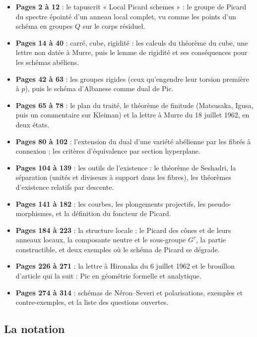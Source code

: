 \documentclass[11pt,a4paper]{article}
\begin{document}
\begin{itemize}
  \item \textbf{Pages 2 à 12} : le tapuscrit « Local Picard schemes » : le
    groupe de Picard du spectre épointé d'un anneau local complet, vu comme les
    points d'un schéma en groupes $Q$ sur le corps résiduel.
  \item \textbf{Pages 14 à 40} : carré, cube, rigidité : les calculs du
    théorème du cube, une lettre non datée à Murre, puis le lemme de rigidité et
    ses conséquences pour les schémas abéliens.
  \item \textbf{Pages 42 à 63} : les groupes rigides (ceux qu'engendre leur
    torsion première à $p$), puis le schéma d'Albanese comme dual de $\mathrm{Pic}$.
  \item \textbf{Pages 65 à 78} : le plan du traité, le théorème de finitude
    (Matsusaka, Igusa, puis un commentaire sur Kleiman) et la lettre à Murre du
    18 juillet 1962, en deux états.
  \item \textbf{Pages 80 à 102} : l'extension du dual d'une variété abélienne
    par les fibrés à connexion ; les critères d'équivalence par section
    hyperplane.
  \item \textbf{Pages 104 à 139} : les outils de l'existence : le théorème de
    Seshadri, la séparation (unités et diviseurs à support dans les fibres), les
    théorèmes d'existence relatifs par descente.
  \item \textbf{Pages 141 à 182} : les courbes, les plongements projectifs, les
    pseudo-morphismes, et la définition du foncteur de Picard.
  \item \textbf{Pages 184 à 223} : la structure locale : le Picard des cônes et
    de leurs anneaux locaux, la composante neutre et le sous-groupe $G^\tau$, la
    partie constructible, et deux exemples où le schéma de Picard se dégrade.
  \item \textbf{Pages 226 à 271} : la lettre à Hironaka du 6 juillet 1962 et
    le brouillon d'article qui la suit : $\mathrm{Pic}$ en géométrie formelle et
    analytique.
  \item \textbf{Pages 274 à 314} : schémas de Néron--Severi et polarisations,
    exemples et contre-exemples, et la liste des questions ouvertes.
\end{itemize}

\subsection*{La notation}
\end{document}
